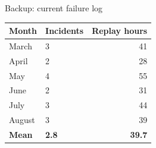 \documentclass[aspectratio=169,11pt]{beamer}
\begin{document}
\appendix

\begin{frame}{Backup: current failure log}
  \small
  \begin{table}
    \centering
    \begin{tabular}{llr}
      \toprule
      Month & Incidents & Replay hours \\
      \midrule
      March     & 3 & 41 \\
      April     & 2 & 28 \\
      May       & 4 & 55 \\
      June      & 2 & 31 \\
      July      & 3 & 44 \\
      August    & 3 & 39 \\
      \midrule
      \textbf{Mean} & \textbf{2.8} & \textbf{39.7} \\
      \bottomrule
    \end{tabular}
  \end{table}
\end{frame}
\end{document}
